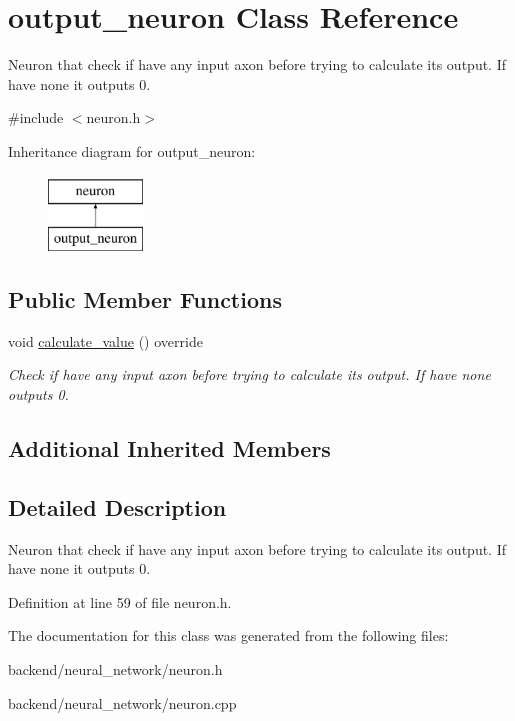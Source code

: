 \hypertarget{classoutput__neuron}{}\section{output\+\_\+neuron Class Reference}
\label{classoutput__neuron}


Neuron that check if have any input axon before trying to calculate its output. If have none it outputs 0.  




{\ttfamily \#include $<$neuron.\+h$>$}

Inheritance diagram for output\+\_\+neuron\+:\begin{figure}[H]
\begin{center}
\leavevmode
\includegraphics[height=2.000000cm]{classoutput__neuron}
\end{center}
\end{figure}
\subsection*{Public Member Functions}
\begin{DoxyCompactItemize}
\item 
\mbox{\label{classoutput__neuron_a09856c092b517aee4f4aaa59e0ce8e02}} 
void \mbox{\hyperlink{classoutput__neuron_a09856c092b517aee4f4aaa59e0ce8e02}{calculate\+\_\+value}} () override
\begin{DoxyCompactList}\small\item\em Check if have any input axon before trying to calculate its output. If have none outputs 0. \end{DoxyCompactList}\end{DoxyCompactItemize}
\subsection*{Additional Inherited Members}


\subsection{Detailed Description}
Neuron that check if have any input axon before trying to calculate its output. If have none it outputs 0. 

Definition at line 59 of file neuron.\+h.



The documentation for this class was generated from the following files\+:\begin{DoxyCompactItemize}
\item 
backend/neural\+\_\+network/neuron.\+h\item 
backend/neural\+\_\+network/neuron.\+cpp\end{DoxyCompactItemize}
